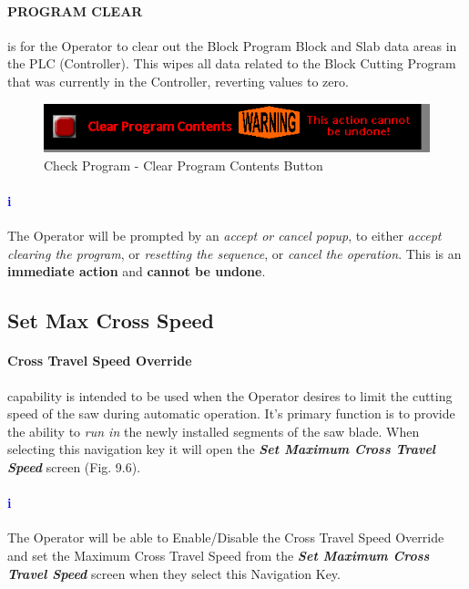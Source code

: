 \paragraph{PROGRAM CLEAR}is for the Operator to clear out the Block Program Block and Slab data areas in the PLC (Controller). This wipes all data related to the Block Cutting Program that was currently in the Controller, reverting values to zero.
\begin{figure}
	\centering
	\includegraphics[width=.3\linewidth]{screen-captures/program/pgm_review1-clr-pgm}
	\caption{Check Program - Clear Program Contents Button}
	\label{fig:pgm-clr}
\end{figure}
\paragraph{\textbf{\LARGE \textcolor{blue}{i}}}The Operator will be prompted by an \textit{accept or cancel popup}, to either \textsl{accept clearing the program}, or \textsl{resetting the sequence}, or \textsl{cancel the operation}. This is an \textbf{immediate action} and \textbf{cannot be undone}.
\subsection{Set Max Cross Speed}\paragraph*{Cross Travel Speed Override}capability is intended to be used when the Operator desires to limit the cutting speed of the saw during automatic operation. It's primary function is to provide the ability to \emph{run in} the newly installed segments of the saw blade. When selecting this navigation key it will open the \textbf{\textit{Set Maximum Cross Travel Speed}} screen (Fig. 9.6).

\paragraph{\textbf{\LARGE \textcolor{blue}{i}}}The Operator will be able to Enable/Disable the Cross Travel Speed Override and set the Maximum Cross Travel Speed from the \textbf{\textit{Set Maximum Cross Travel Speed}} screen when they select this Navigation Key.

